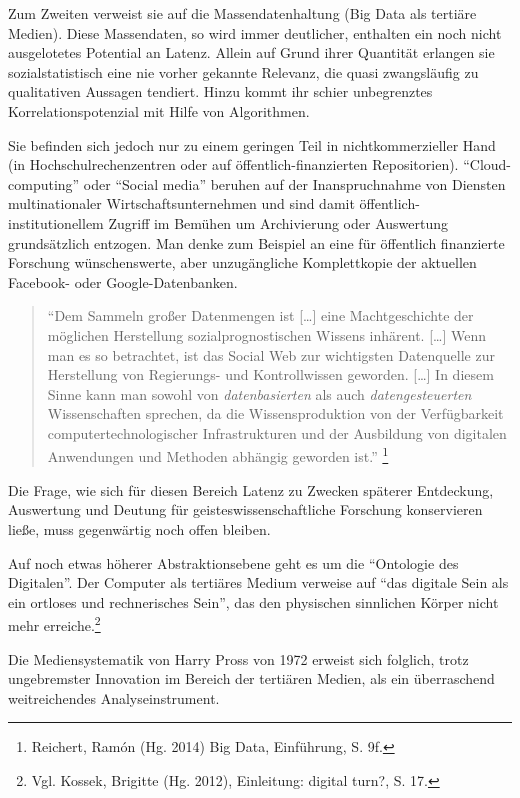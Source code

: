 \documentclass[a4paper,
fontsize=11pt,
oneside,
numbers=noperiodatend,
parskip=half-,
bibliography=totoc,
final
]{scrartcl}
\begin{document}
Zum Zweiten verweist sie auf die Massendatenhaltung (Big Data als
tertiäre Medien). Diese Massendaten, so wird immer deutlicher, enthalten
ein noch nicht ausgelotetes Potential an Latenz. Allein auf Grund ihrer
Quantität erlangen sie sozialstatistisch eine nie vorher gekannte
Relevanz, die quasi zwangsläufig zu qualitativen Aussagen tendiert.
Hinzu kommt ihr schier unbegrenztes Korrelationspotenzial mit Hilfe von
Algorithmen.

Sie befinden sich jedoch nur zu einem geringen Teil in
nichtkommerzieller Hand (in Hochschulrechenzentren oder auf
öffentlich-finanzierten Repositorien). \enquote{Cloud-computing} oder
\enquote{Social media} beruhen auf der Inanspruchnahme von Diensten
multinationaler Wirtschaftsunternehmen und sind damit
öffentlich-institutionellem Zugriff im Bemühen um Archivierung oder
Auswertung grundsätzlich entzogen. Man denke zum Beispiel an eine für
öffentlich finanzierte Forschung wünschenswerte, aber unzugängliche
Komplettkopie der aktuellen Facebook- oder Google-Datenbanken.

\begin{quote}
\enquote{Dem Sammeln großer Datenmengen ist {[}\ldots{}{]} eine
Machtgeschichte der möglichen Herstellung sozialprognostischen Wissens
inhärent. {[}\ldots{}{]} Wenn man es so betrachtet, ist das Social Web
zur wichtigsten Datenquelle zur Herstellung von Regierungs- und
Kontrollwissen geworden. {[}\ldots{}{]} In diesem Sinne kann man sowohl
von \emph{datenbasierten} als auch \emph{datengesteuerten}
Wissenschaften sprechen, da die Wissensproduktion von der Verfügbarkeit
computertechnologischer Infrastrukturen und der Ausbildung von digitalen
Anwendungen und Methoden abhängig geworden ist.} \footnote{Reichert,
  Ramón (Hg. 2014) Big Data, Einführung, S. 9f.}
\end{quote}

Die Frage, wie sich für diesen Bereich Latenz zu Zwecken späterer
Entdeckung, Auswertung und Deutung für geisteswissenschaftliche
Forschung konservieren ließe, muss gegenwärtig noch offen bleiben.

Auf noch etwas höherer Abstraktionsebene geht es um die
\enquote{Ontologie des Digitalen}. Der Computer als tertiäres Medium
verweise auf \enquote{das digitale Sein als ein ortloses und
rechnerisches Sein}, das den physischen sinnlichen Körper nicht mehr
erreiche.\footnote{Vgl. Kossek, Brigitte (Hg. 2012), Einleitung: digital
  turn?, S. 17.}

Die Mediensystematik von Harry Pross von 1972 erweist sich folglich,
trotz ungebremster Innovation im Bereich der tertiären Medien, als ein
überraschend weitreichendes Analyseinstrument.
\end{document}

